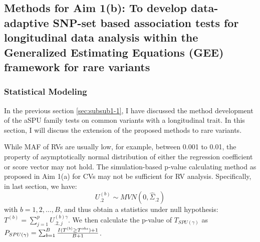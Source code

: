 \documentclass[12pt]{article}
\begin{document}










\subsection{Methods for Aim 1(b): To develop data-adaptive SNP-set based association tests for longitudinal data analysis within the Generalized Estimating Equations (GEE) framework for rare variants}\label{sec:subsec2}
\subsubsection{Statistical Modeling}\label{sec:subsub2-1}
In the previous section \ref{sec:subsub1-1}, I have discussed the method development of the aSPU family tests on common variants with a longitudinal trait. In this section, I will discuss the extension of the proposed methods to rare variants.

While MAF of RVs are usually low, for example, between 0.001 to 0.01, the property of asymptotically normal distribution of either the regression coefficient or score vector may not hold. The simulation-based p-value calculating method as proposed in Aim 1(a) for CVs may not be sufficient for RV analysis. Specifically, in last section, we have:
$$
U_{.2}^{ (b) } \sim MVN \left( 0, \hat{\Sigma}_{.2} \right)
$$
with $b = 1,2,\ldots,B$, and thus obtain a statistics under null hypothesis: $T ^ {(b)} = \sum_{j=1}^p U^{ (b)\gamma }_{.2, j} $. We then calculate the p-value of $T_{ SPU(\gamma) }$ as $P_{ SPU(\gamma) } = \sum_{b=1}^B { I(T^{(b)} \geq T ^ {obs} ) + 1  \over B + 1 } $. 
\end{document}

